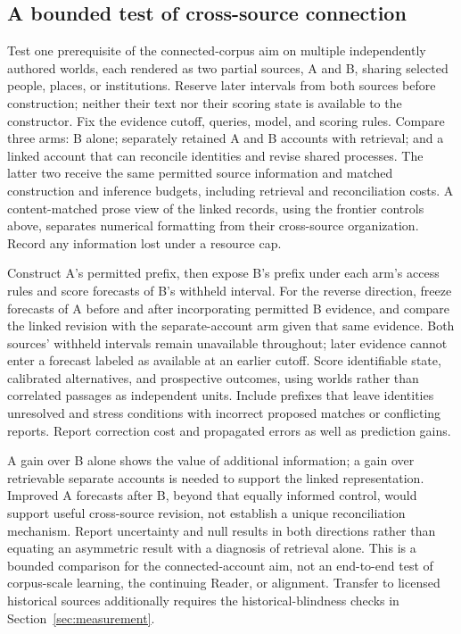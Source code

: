 \documentclass[10pt]{article}
\begin{document}
\subsection{A bounded test of cross-source connection}
\label{sec:cross-source-test}

Test one prerequisite of the connected-corpus aim on multiple independently
authored worlds, each rendered as two partial sources, A and B, sharing selected
people, places, or institutions. Reserve later intervals from both sources
before construction; neither their text nor their scoring state is available
to the constructor. Fix the evidence cutoff, queries, model, and scoring rules.
Compare three arms: B alone; separately retained A and B accounts with
retrieval; and a linked account that can reconcile identities and revise
shared processes. The latter two receive the same permitted source information
and matched construction and inference budgets, including retrieval and
reconciliation costs. A content-matched prose view of the linked records,
using the frontier controls above, separates numerical formatting from their
cross-source organization. Record any information lost under a resource cap.

Construct A's permitted prefix, then expose B's prefix under each arm's access
rules and score forecasts of B's withheld interval. For the reverse direction,
freeze forecasts of A before and after incorporating permitted B evidence,
and compare the linked revision with the separate-account arm given that same
evidence. Both sources' withheld intervals remain unavailable throughout;
later evidence cannot enter a forecast labeled as available at an earlier
cutoff. Score identifiable state, calibrated alternatives, and prospective
outcomes, using worlds rather than correlated passages as independent units.
Include prefixes that leave identities unresolved and stress conditions with
incorrect proposed matches or conflicting reports. Report correction cost and
propagated errors as well as prediction gains.

A gain over B alone shows the value of additional information; a gain over
retrievable separate accounts is needed to support the linked representation.
Improved A forecasts after B, beyond that equally informed control, would
support useful cross-source revision, not establish a unique reconciliation
mechanism. Report uncertainty and null results in both directions rather than
equating an asymmetric result with a diagnosis of retrieval alone. This is a
bounded comparison for the connected-account aim, not an end-to-end test of
corpus-scale learning, the continuing Reader, or alignment. Transfer to licensed
historical sources additionally requires the historical-blindness checks in
Section~\ref{sec:measurement}.
\end{document}

